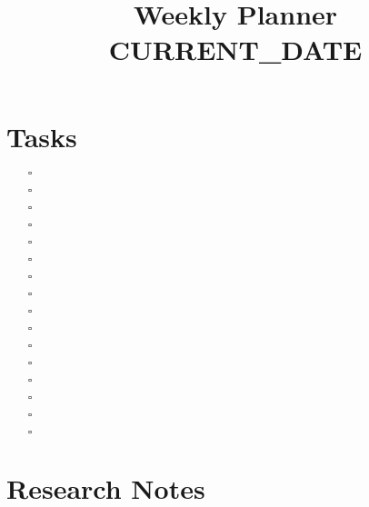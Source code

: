 \documentclass[a4paper,12pt]{article}
\title{Weekly Planner \hfill CURRENT_DATE}
\date{}
\begin{document}
\maketitle
\vspace{-3cm} %

\section*{Tasks}

\begin{multicols}{2}
\begin{itemize}[left=8pt]
  \item[$\square$] \hrulefill
  \item[$\square$] \hrulefill
  \item[$\square$] \hrulefill
  \item[$\square$] \hrulefill
  \item[$\square$] \hrulefill
  \item[$\square$] \hrulefill
  \item[$\square$] \hrulefill
  \item[$\square$] \hrulefill
\end{itemize}

\columnbreak
\begin{itemize}[left=8pt]
  \item[$\square$] \hrulefill
  \item[$\square$] \hrulefill
  \item[$\square$] \hrulefill
  \item[$\square$] \hrulefill
  \item[$\square$] \hrulefill
  \item[$\square$] \hrulefill
  \item[$\square$] \hrulefill
  \item[$\square$] \hrulefill
\end{itemize}


\end{multicols}

\section*{Research Notes}

\hrulefill
\doublespacing


\hrulefill

\hrulefill

\hrulefill
\end{document}
